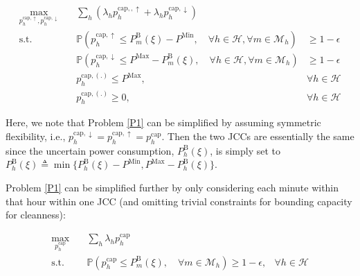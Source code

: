 \documentclass{report}
\begin{document}
\begin{align}\label{P1}
    \max_{p_{h}^{\text{cap}, \uparrow}, p_{h}^{\text{cap}, \downarrow}} \quad & \sum_h \left( \lambda_h p_{h}^{\text{cap}, ,\uparrow} + \lambda_h p_{h}^{\text{cap},\downarrow} \right)                                                                                               \\
    \text{s.t.} \quad                                                         & \mathbb{P}  \left( p_{h}^{\text{cap}, \uparrow} \leq P_{m}^{\text{B}}(\xi) - P^{\text{Min}}, \quad \forall{h} \in \mathcal{H}, \forall{m} \in \mathcal{M}_{h}  \right)   & \geq 1 - \epsilon          \\
    & \mathbb{P}  \left( p_{h}^{\text{cap}, \downarrow} \leq P^{\text{Max}} - P_{m}^{\text{B}}(\xi), \quad \forall{h} \in \mathcal{H}, \forall{m} \in \mathcal{M}_{h}  \right) & \geq 1 - \epsilon          \\
    & p_{h}^{\text{cap},(.)} \leq P^{\text{Max}},                                                                                                                         & \forall{h} \in \mathcal{H} \\
    & p_{h}^{\text{cap},(.)} \geq 0,                                                                                                                              & \forall{h} \in \mathcal{H}
\end{align}

Here, we note that Problem \ref{P1} can be simplified by assuming symmetric flexibility, i.e., $p_{h}^{\text{cap},\downarrow} = p_{h}^{\text{cap},\uparrow} = p_{h}^{\text{cap}}$. Then the two JCCs are essentially the same since the uncertain power consumption, $P_{h}^{\text{B}}(\xi)$, is simply set to $P_{h}^{\text{B}}(\xi) \triangleq \min \{ P_{h}^{\text{B}}(\xi) - P^{\text{Min}}, P^{\text{Max}} - P_{h}^{\text{B}}(\xi) \}$.

Problem \ref{P1} can be simplified further by only considering each minute within that hour within one JCC (and omitting trivial constraints for bounding capacity for cleanness):

\begin{align}\label{P2}
    \max_{p_{h}^{\text{cap}}} \quad & \sum_h \lambda_h p_{h}^{\text{cap}}                                                                                                                             \\
    \text{s.t.} \quad               & \mathbb{P}  \left( p_{h}^{\text{cap}} \leq P_{m}^{\text{B}}(\xi), \quad \forall{m} \in \mathcal{M}_{h}  \right) \geq 1 - \epsilon, & \forall{h} \in \mathcal{H}
\end{align}
\end{document}
